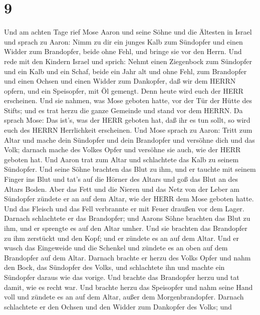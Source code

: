 \hypertarget{section-8}{%
\section{9}\label{section-8}}

 Und am achten Tage rief Mose Aaron und seine Söhne und die
Ältesten in Israel  und sprach zu Aaron: Nimm zu dir ein
junges Kalb zum Sündopfer und einen Widder zum Brandopfer, beide ohne
Fehl, und bringe sie vor den Herrn.  Und rede mit den
Kindern Israel und sprich: Nehmt einen Ziegenbock zum Sündopfer und ein
Kalb und ein Schaf, beide ein Jahr alt und ohne Fehl, zum Brandopfer
 und einen Ochsen und einen Widder zum Dankopfer, daß wir
dem HERRN opfern, und ein Speisopfer, mit Öl gemengt. Denn heute wird
euch der HERR erscheinen.  Und sie nahmen, was Mose geboten
hatte, vor der Tür der Hütte des Stifts; und es trat herzu die ganze
Gemeinde und stand vor dem HERRN.  Da sprach Mose: Das
ist's, was der HERR geboten hat, daß ihr es tun sollt, so wird euch des
HERRN Herrlichkeit erscheinen.  Und Mose sprach zu Aaron:
Tritt zum Altar und mache dein Sündopfer und dein Brandopfer und
versöhne dich und das Volk; darnach mache des Volkes Opfer und versöhne
sie auch, wie der HERR geboten hat.  Und Aaron trat zum
Altar und schlachtete das Kalb zu seinem Sündopfer.  Und
seine Söhne brachten das Blut zu ihm, und er tauchte mit seinem Finger
ins Blut und tat's auf die Hörner des Altars und goß das Blut an des
Altars Boden.  Aber das Fett und die Nieren und das Netz
von der Leber am Sündopfer zündete er an auf dem Altar, wie der HERR dem
Mose geboten hatte.  Und das Fleisch und das Fell
verbrannte er mit Feuer draußen vor dem Lager.  Darnach
schlachtete er das Brandopfer; und Aarons Söhne brachten das Blut zu
ihm, und er sprengte es auf den Altar umher.  Und sie
brachten das Brandopfer zu ihm zerstückt und den Kopf; und er zündete es
an auf dem Altar.  Und er wusch das Eingeweide und die
Schenkel und zündete es an oben auf dem Brandopfer auf dem Altar.
 Darnach brachte er herzu des Volks Opfer und nahm den
Bock, das Sündopfer des Volks, und schlachtete ihn und machte ein
Sündopfer daraus wie das vorige.  Und brachte das
Brandopfer herzu und tat damit, wie es recht war.  Und
brachte herzu das Speisopfer und nahm seine Hand voll und zündete es an
auf dem Altar, außer dem Morgenbrandopfer.  Darnach
schlachtete er den Ochsen und den Widder zum Dankopfer des Volks; und
